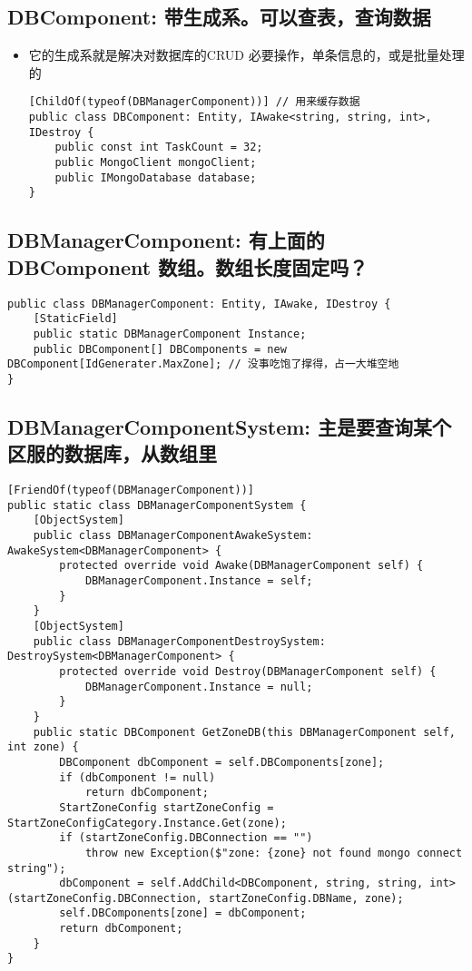 \documentclass[9pt, b5paper]{article}
\begin{document}
\subsection{DBComponent: 带生成系。可以查表，查询数据}
\label{sec-5-2}
\begin{itemize}
\item 它的生成系就是解决对数据库的CRUD 必要操作，单条信息的，或是批量处理的
\begin{verbatim}
[ChildOf(typeof(DBManagerComponent))] // 用来缓存数据
public class DBComponent: Entity, IAwake<string, string, int>, IDestroy {
    public const int TaskCount = 32;
    public MongoClient mongoClient;
    public IMongoDatabase database;
}
\end{verbatim}
\end{itemize}
\subsection{DBManagerComponent: 有上面的 DBComponent 数组。数组长度固定吗？}
\label{sec-5-3}
\begin{verbatim}
public class DBManagerComponent: Entity, IAwake, IDestroy {
    [StaticField]
    public static DBManagerComponent Instance;
    public DBComponent[] DBComponents = new DBComponent[IdGenerater.MaxZone]; // 没事吃饱了撑得，占一大堆空地
}
\end{verbatim}
\subsection{DBManagerComponentSystem: 主是要查询某个区服的数据库，从数组里}
\label{sec-5-4}
\begin{verbatim}
[FriendOf(typeof(DBManagerComponent))]
public static class DBManagerComponentSystem {
    [ObjectSystem]
    public class DBManagerComponentAwakeSystem: AwakeSystem<DBManagerComponent> {
        protected override void Awake(DBManagerComponent self) {
            DBManagerComponent.Instance = self;
        }
    }
    [ObjectSystem]
    public class DBManagerComponentDestroySystem: DestroySystem<DBManagerComponent> {
        protected override void Destroy(DBManagerComponent self) {
            DBManagerComponent.Instance = null;
        }
    }
    public static DBComponent GetZoneDB(this DBManagerComponent self, int zone) {
        DBComponent dbComponent = self.DBComponents[zone];
        if (dbComponent != null) 
            return dbComponent;
        StartZoneConfig startZoneConfig = StartZoneConfigCategory.Instance.Get(zone);
        if (startZoneConfig.DBConnection == "") 
            throw new Exception($"zone: {zone} not found mongo connect string");
        dbComponent = self.AddChild<DBComponent, string, string, int>(startZoneConfig.DBConnection, startZoneConfig.DBName, zone);
        self.DBComponents[zone] = dbComponent;
        return dbComponent;
    }
}
\end{verbatim}
\end{document}
